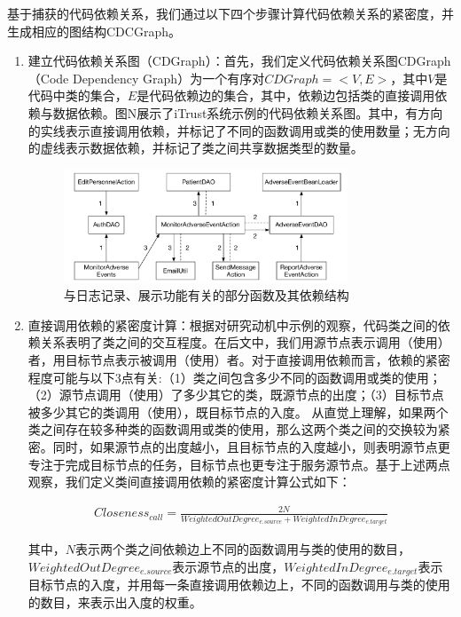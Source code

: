 基于捕获的代码依赖关系，我们通过以下四个步骤计算代码依赖关系的紧密度，并生成相应的图结构CDCGraph。

\begin{enumerate}
  \item 建立代码依赖关系图（CDGraph）：首先，我们定义代码依赖关系图CDGraph（Code Dependency Graph）为一个有序对$CDGraph = <V, E>$，其中$V$是代码中类的集合，$E$是代码依赖边的集合，其中，依赖边包括类的直接调用依赖与数据依赖。图N展示了iTrust系统示例的代码依赖关系图。其中，有方向的实线表示直接调用依赖，并标记了不同的函数调用或类的使用数量；无方向的虚线表示数据依赖，并标记了类之间共享数据类型的数量。

  \begin{figure}[thb]
    \centering
    \includegraphics[width=0.8\textwidth]{./figures/traceability_sample/sample_weight.pdf}
    \caption{与日志记录、展示功能有关的部分函数及其依赖结构}
    \label{F:sample_weight}
  \end{figure}

  \item 直接调用依赖的紧密度计算：根据对研究动机中示例的观察，代码类之间的依赖关系表明了类之间的交互程度。在后文中，我们用源节点表示调用（使用）者，用目标节点表示被调用（使用）者。对于直接调用依赖而言，依赖的紧密程度可能与以下3点有关:（1）类之间包含多少不同的函数调用或类的使用；（2）源节点调用（使用）了多少其它的类，既源节点的出度；（3）目标节点被多少其它的类调用（使用），既目标节点的入度。 从直觉上理解，如果两个类之间存在较多种类的函数调用或类的使用，那么这两个类之间的交换较为紧密。同时，如果源节点的出度越小，且目标节点的入度越小，则表明源节点更专注于完成目标节点的任务，目标节点也更专注于服务源节点。基于上述两点观察，我们定义类间直接调用依赖的紧密度计算公式如下：

  \begin{align}Closeness_{call}=\frac {2N} {WeightedOutDegree_{e.source}+WeightedInDegree_{e.target}}\end{align}

  其中，$N$表示两个类之间依赖边上不同的函数调用与类的使用的数目，$WeightedOutDegree_{e.source}$表示源节点的出度，$WeightedInDegree_{e.target}$表示目标节点的入度，并用每一条直接调用依赖边上，不同的函数调用与类的使用的数目，来表示出入度的权重。


\end{enumerate}
